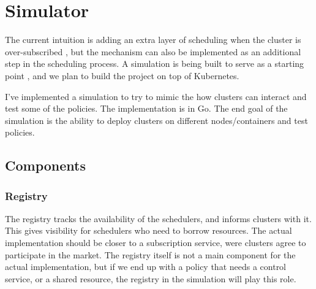 \section{Simulator}
The current intuition is adding an extra layer 
of scheduling when the cluster is over-subscribed \cite{zaharia_delay_2010}, 
but the mechanism can also be implemented as an additional step in the scheduling process. 
A simulation is being built to serve as a starting point \cite{sched-github}, 
and we plan to build the project on top of Kubernetes.

I've implemented a simulation to try to mimic the how clusters can interact and test some of the policies. 
The implementation is in Go. The end goal of the simulation is the ability to deploy clusters on different 
nodes/containers and test policies.

\subsection{Components}
\subsubsection{Registry}
The registry tracks the availability of the schedulers, and informs clusters with it. 
This gives visibility for schedulers who need to borrow resources. 
The actual implementation should be closer to a subscription service, 
were clusters agree to participate in the market. The registry itself is not a main 
component for the actual implementation, but if we end up with a policy that needs a control service, 
or a shared resource, the registry in the simulation will play this role. 